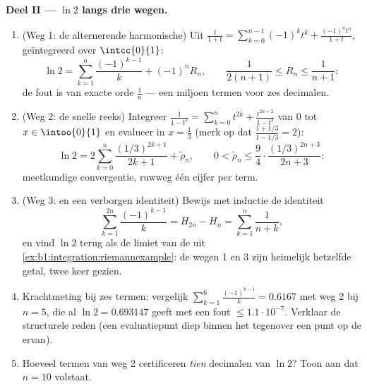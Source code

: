 \begin{problem}
\medskip
\noindent\textbf{Deel II --- $\ln 2$ langs drie wegen.}
\begin{enumerate}[resume]
  \item (Weg 1: de alternerende harmonische) Uit $\frac{1}{1+t} =
        \sum_{k=0}^{n-1}(-1)^k t^k + \frac{(-1)^n t^n}{1+t}$,
        geïntegreerd over $\intcc{0}{1}$:
        \[
        \ln 2 = \sum_{k=1}^{n} \frac{(-1)^{k-1}}{k} + (-1)^n
        R_n, \qquad \frac{1}{2(n+1)} \leq R_n \leq
        \frac{1}{n+1} :
        \]
        de fout is van exacte orde $\frac 1n$ --- een miljoen
        termen voor zes decimalen.
  \item (Weg 2: de snelle reeks) Integreer $\frac{1}{1 - t^2} =
        \sum_{k=0}^{n} t^{2k} + \frac{t^{2n+2}}{1-t^2}$ van $0$
        tot $x \in \intoo{0}{1}$ en evalueer in $x = \frac13$
        (merk op dat $\frac{1 + 1/3}{1 - 1/3} = 2$):
        \[
        \ln 2 = 2\sum_{k=0}^{n} \frac{(1/3)^{2k+1}}{2k+1} +
        \tilde\rho_n,
        \qquad
        0 < \tilde\rho_n \leq \frac{9}{4}\cdot
        \frac{(1/3)^{2n+3}}{2n+3} :
        \]
        meetkundige convergentie, ruwweg één cijfer per term.
  \item (Weg 3:  en een verborgen identiteit) Bewijs
        met inductie de identiteit
        \[
        \sum_{k=1}^{2n} \frac{(-1)^{k-1}}{k} = H_{2n} - H_n =
        \sum_{k=1}^{n} \frac{1}{n + k} ,
        \]
        en vind $\ln 2$ terug als de limiet van de  uit
        \cref{ex:b1:integration:riemannexample}: de wegen 1 en 3
        zijn heimelijk hetzelfde getal, twee keer gezien.
  \item Krachtmeting bij zes termen: vergelijk $\sum_{k=1}^{6}
        \frac{(-1)^{k-1}}{k} = 0.6167$ met weg 2 bij $n = 5$, die
        al $\ln 2 = 0.693147$ geeft met een fout $\leq
        1.1\cdot10^{-7}$. Verklaar de structurele reden (een
        evaluatiepunt diep binnen het 
        tegenover een punt op de  ervan).
  \item Hoeveel termen van weg 2 certificeren \emph{tien}
        decimalen van $\ln 2$? Toon aan dat $n = 10$ volstaat.
\end{enumerate}


\end{problem}
